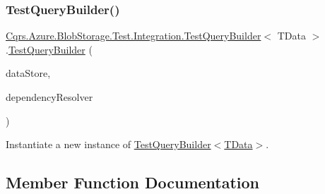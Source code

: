 \subsubsection{\texorpdfstring{Test\+Query\+Builder()}{TestQueryBuilder()}}
{\footnotesize\ttfamily \hyperlink{classCqrs_1_1Azure_1_1BlobStorage_1_1Test_1_1Integration_1_1TestQueryBuilder}{Cqrs.\+Azure.\+Blob\+Storage.\+Test.\+Integration.\+Test\+Query\+Builder}$<$ T\+Data $>$.\hyperlink{classCqrs_1_1Azure_1_1BlobStorage_1_1Test_1_1Integration_1_1TestQueryBuilder}{Test\+Query\+Builder} (\begin{DoxyParamCaption}\item[{\hyperlink{interfaceCqrs_1_1DataStores_1_1IDataStore}{I\+Data\+Store}$<$ T\+Data $>$}]{data\+Store,  }\item[{\hyperlink{interfaceCqrs_1_1Configuration_1_1IDependencyResolver}{I\+Dependency\+Resolver}}]{dependency\+Resolver }\end{DoxyParamCaption})}



Instantiate a new instance of \hyperlink{classCqrs_1_1Azure_1_1BlobStorage_1_1Test_1_1Integration_1_1TestQueryBuilder_a22e5b4e327afe4f0f0d34e273dfd72ac_a22e5b4e327afe4f0f0d34e273dfd72ac}{Test\+Query\+Builder$<$\+T\+Data$>$}. 



\subsection{Member Function Documentation}
\mbox{\label{classCqrs_1_1Azure_1_1BlobStorage_1_1Test_1_1Integration_1_1TestQueryBuilder_a33024ff6952fe0dbc51409e23c217ece_a33024ff6952fe0dbc51409e23c217ece}} 
